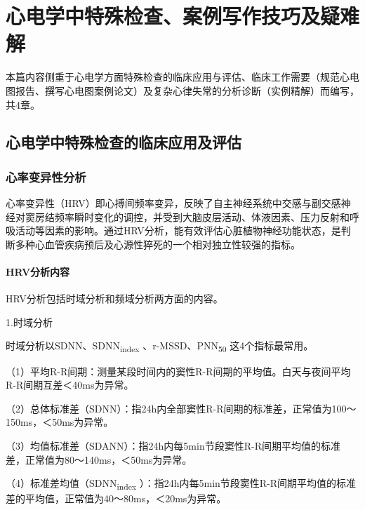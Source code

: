 \part{心电学中特殊检查、案例写作技巧及疑难解}

本篇内容侧重于心电学方面特殊检查的临床应用与评估、临床工作需要（规范心电图报告、撰写心电图案例论文）及复杂心律失常的分析诊断（实例精解）而编写，共4章。

\protect\hypertarget{text00056.html}{}{}

\protect\hypertarget{text00056.htmlux5cux23chapter56}{}{}

\chapter{心电学中特殊检查的临床应用及评估}

\protect\hypertarget{text00056.htmlux5cux23subid657}{}{}

\section{心率变异性分析}

心率变异性（HRV）即心搏间频率变异，反映了自主神经系统中交感与副交感神经对窦房结频率瞬时变化的调控，并受到大脑皮层活动、体液因素、压力反射和呼吸活动等因素的影响。通过HRV分析，能有效评估心脏植物神经功能状态，是判断多种心血管疾病预后及心源性猝死的一个相对独立性较强的指标。

\protect\hypertarget{text00056.htmlux5cux23subid658}{}{}

\subsection{HRV分析内容}

HRV分析包括时域分析和频域分析两方面的内容。

1.时域分析

时域分析以SDNN、SDNN\textsubscript{index}
、r-MSSD、PNN\textsubscript{50} 这4个指标最常用。

（1）平均R-R间期：测量某段时间内的窦性R-R间期的平均值。白天与夜间平均R-R间期互差＜40ms为异常。

（2）总体标准差（SDNN）：指24h内全部窦性R-R间期的标准差，正常值为100～150ms，＜50ms为异常。

（3）均值标准差（SDANN）：指24h内每5min节段窦性R-R间期平均值的标准差，正常值为80～140ms，＜50ms为异常。

（4）标准差均值（SDNN\textsubscript{index}
）：指24h内每5min节段窦性R-R间期平均值的标准差的平均值，正常值为40～80ms，＜20ms为异常。

